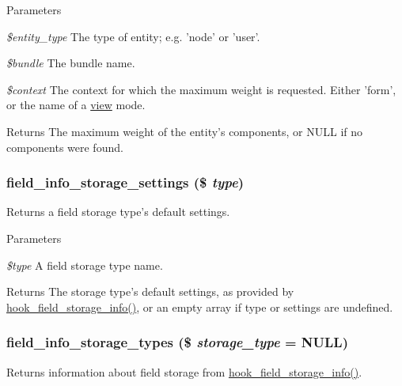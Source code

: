 \begin{DoxyParams}{Parameters}
\item[{\em \$entity\_\-type}]The type of entity; e.g. 'node' or 'user'. \item[{\em \$bundle}]The bundle name. \item[{\em \$context}]The context for which the maximum weight is requested. Either 'form', or the name of a \hyperlink{classview}{view} mode. \end{DoxyParams}
\begin{DoxyReturn}{Returns}
The maximum weight of the entity's components, or NULL if no components were found. 
\end{DoxyReturn}
\hypertarget{group__field__info_ga378368be6e00368074e604c4185f1b4b}{
\subsubsection[{field\_\-info\_\-storage\_\-settings}]{\setlength{\rightskip}{0pt plus 5cm}field\_\-info\_\-storage\_\-settings (\$ {\em type})}}
\label{group__field__info_ga378368be6e00368074e604c4185f1b4b}
Returns a field storage type's default settings.


\begin{DoxyParams}{Parameters}
\item[{\em \$type}]A field storage type name.\end{DoxyParams}
\begin{DoxyReturn}{Returns}
The storage type's default settings, as provided by \hyperlink{group__field__storage_gadc5bfde3133504e946bb0aae8babe6f3}{hook\_\-field\_\-storage\_\-info()}, or an empty array if type or settings are undefined. 
\end{DoxyReturn}
\hypertarget{group__field__info_ga1c47f34b9ccd36dd29cf6059a270573b}{
\subsubsection[{field\_\-info\_\-storage\_\-types}]{\setlength{\rightskip}{0pt plus 5cm}field\_\-info\_\-storage\_\-types (\$ {\em storage\_\-type} = {\ttfamily NULL})}}
\label{group__field__info_ga1c47f34b9ccd36dd29cf6059a270573b}
Returns information about field storage from \hyperlink{group__field__storage_gadc5bfde3133504e946bb0aae8babe6f3}{hook\_\-field\_\-storage\_\-info()}.


